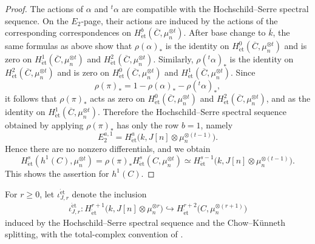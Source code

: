 \documentclass[a4paper,12pt]{amsart}
\numberwithin{equation}{section}
\theoremstyle{definition}
\newcommand{\et}{\mathrm{\acute et}}
\newcommand{\Het}{H_{\mathrm{\acute et}}}
\begin{document}
\begin{proof}
    The actions of $\alpha$ and ${}^t\alpha$ are compatible with the
    Hochschild--Serre spectral sequence. On the $E_2$-page, their
    actions are induced by the actions of the corresponding
    correspondences on $\Het^b(\overline C,\mu_n^{\otimes t})$.
    After base change to $\overline k$, the same formulas as above show
    that $\rho(\alpha)_\ast$ is the identity on
    $\Het^0(\overline C,\mu_n^{\otimes t})$ 
    and is zero on
    $\Het^1(\overline C,\mu_n^{\otimes t})$ 
    and $\Het^2(\overline C,\mu_n^{\otimes t})$.
    Similarly, $\rho({}^t\alpha)_\ast$ is the identity on
    $\Het^2(\overline C,\mu_n^{\otimes t})$
    and is zero on
    $\Het^0(\overline C,\mu_n^{\otimes t})$
    and $\Het^1(\overline C,\mu_n^{\otimes t})$.
    Since
    \[
    \rho(\pi)_\ast
    =
    1-\rho(\alpha)_\ast-\rho({}^t\alpha)_\ast,
    \]
    it follows that $\rho(\pi)_\ast$ acts as zero on
    $\Het^0(\overline C,\mu_n^{\otimes t})$ 
    and $\Het^2(\overline C,\mu_n^{\otimes t})$,
    and as the identity on
    $\Het^1(\overline C,\mu_n^{\otimes t})$.
    Therefore the Hochschild--Serre spectral sequence obtained by
    applying $\rho(\pi)_\ast$ has only the row $b=1$, namely
    \[
    E_2^{a,1}
    =
    \Het^a\bigl(
    k,J[n]\otimes\mu_n^{\otimes(t-1)}
    \bigr).
    \]
    Hence there are no nonzero differentials, and we obtain
    \[
    H^s_\et(h^1(C),\mu_n^{\otimes t})
    =
    \rho(\pi)_\ast
    \Het^s(C,\mu_n^{\otimes t})
    \simeq
    \Het^{s-1}\bigl(
    k,J[n]\otimes\mu_n^{\otimes(t-1)}
    \bigr).
    \]
This shows the assertion for $h^1(C)$.
\end{proof}

For $r\ge 0$, let $\iota^\et_{J,r}$ denote the inclusion 
\begin{align}\label{eq:iota_et}
 \iota^\et_{J,r}\colon
 \Het^{r+1}\bigl(k,J[n]\otimes\mu_n^{\otimes r}\bigr)
 \hookrightarrow
 \Het^{r+2}\bigl(C,\mu_n^{\otimes(r+1)}\bigr)
\end{align}
induced by the Hochschild--Serre spectral sequence and the
Chow--K\"unneth splitting, with the total-complex convention of
\cite[Chapter~II, Section~2, Definition~2.2.3 and p.~104]{NSW08}.
\end{document}
